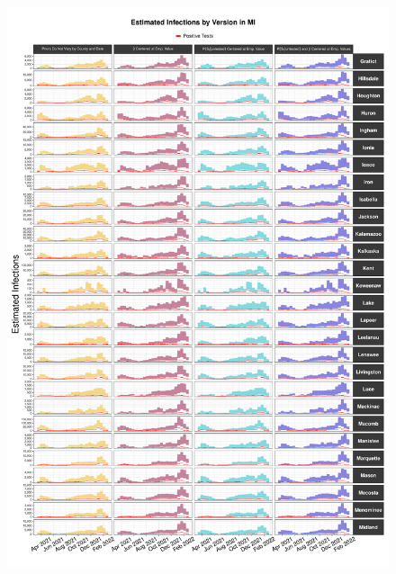 \documentclass[12pt,twoside]{smiththesis}
\begin{document}
\begin{figure}
\includegraphics[width=1\linewidth]{figure/mi2_pb_compared_to_observed} \caption{\label{fig:pb_versions_mi}}\label{fig:unnamed-chunk-25-2}
\end{figure}
\end{document}
